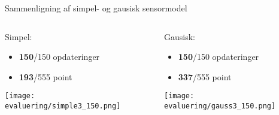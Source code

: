 \begin{frame}[fragile]{Sammenligning af simpel- og gausisk sensormodel}
	\begin{columns}
		\begin{column}{0.5\textwidth}
			Simpel:
			\begin{itemize}
			\item \textbf{150}/150 opdateringer
			\item \textbf{193}/555 point
			\end{itemize}
			\texttt{[image: evaluering/simple3\_150.png]}
		\end{column}
		\begin{column}{0.5\textwidth}
			Gausisk:
			\begin{itemize}
			\item \textbf{150}/150 opdateringer
			\item \textbf{337}/555 point
			\end{itemize}
			\texttt{[image: evaluering/gauss3\_150.png]}
		\end{column}
\end{columns}
\end{frame}
